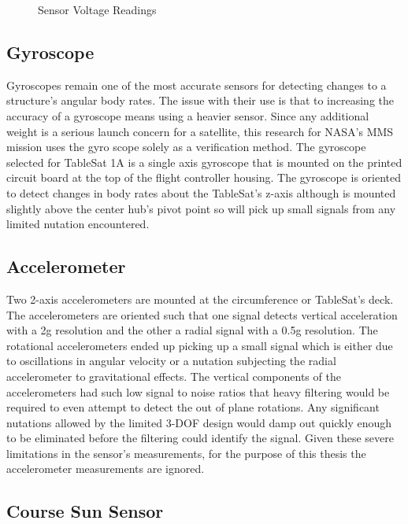 \begin{figure}[H]
\centerline{}
\caption{Sensor Voltage Readings}
\label{fig:SensorVoltageReadings}
\end{figure}

\subsection{Gyroscope}
\label{subsec:Gyroscope}

Gyroscopes remain one of the most accurate sensors for detecting changes to a structure's angular body rates.  The issue with their use is that to increasing the accuracy of a gyroscope means using a heavier sensor.  Since any additional weight is a serious launch concern for a satellite, this research for NASA's MMS mission uses the gyro scope solely as a verification method.  The gyroscope selected for TableSat 1A is a single axis gyroscope that is mounted on the printed circuit board at the top of the flight controller housing.  The gyroscope is oriented to detect changes in body rates about the TableSat's z-axis although is mounted slightly above the center hub's pivot point so will pick up small signals from any limited nutation encountered.

\subsection{Accelerometer}
\label{subsec:Accelerometer}

Two 2-axis accelerometers are mounted at the circumference or TableSat's deck.  The accelerometers are oriented such that one signal detects vertical acceleration with a 2g resolution and the other a radial signal with a 0.5g resolution.  The rotational accelerometers ended up picking up a small signal which is either due to oscillations in angular velocity or a nutation subjecting the radial accelerometer to gravitational effects.  The vertical components of the accelerometers had such low signal to noise ratios that heavy filtering would be required to even attempt to detect the out of plane rotations.  Any significant nutations allowed by the limited 3-DOF design would damp out quickly enough to be eliminated before the filtering could identify the signal.  Given these severe limitations in the sensor's measurements, for the purpose of this thesis the accelerometer measurements are ignored.

\subsection{Course Sun Sensor}
\label{subsec:CourseSunSensor}


